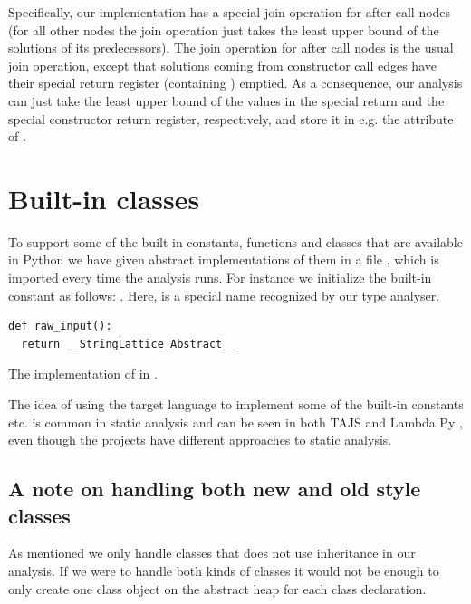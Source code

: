 Specifically, our implementation has a special join operation for after call nodes (for all other nodes the join operation just takes the least upper bound of the solutions of its predecessors). The join operation for after call nodes is the usual join operation, except that solutions coming from constructor call edges have their special return register (containing ) emptied. As a consequence, our analysis can just take the least upper bound of the values in the special return and the special constructor return register, respectively, and store it in e.g. the attribute  of .


\section{Built-in classes}
To support some of the built-in constants, functions and classes that are available in Python we have given abstract implementations of them in a file , which is imported every time the analysis runs. For instance we initialize the built-in constant  as follows: . Here,  is a special name recognized by our type analyser.

\begin{listing}[H]
	\begin{verbatim}
def raw_input():
  return __StringLattice_Abstract__
	\end{verbatim}
	\caption{The implementation of  in .}\label{code:InitConstructorClass}
\end{listing}

The idea of using the target language to implement some of the built-in constants etc. is common in static analysis and can be seen in both TAJS \cite{tajs} and Lambda Py \cite{lambdapy}, even though the projects have different approaches to static analysis.


\subsection{A note on handling both new and old style classes}
As mentioned we only handle classes that does not use inheritance in our analysis. If we were to handle both kinds of classes it would not be enough to only create one class object on the abstract heap for each class declaration.

